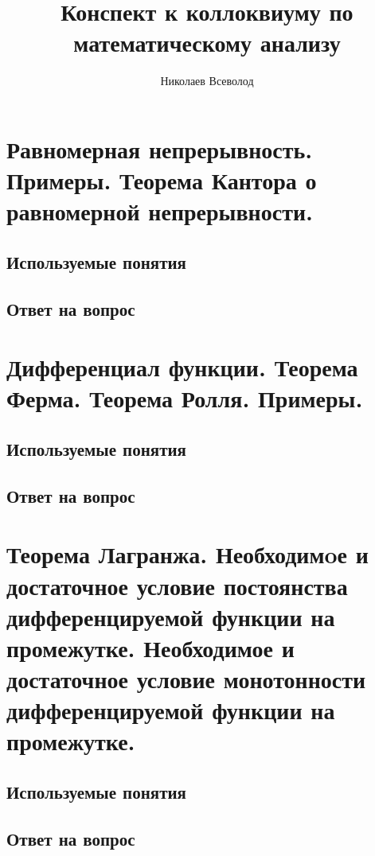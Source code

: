 \documentclass[12pt,a4paper]{article}
\title{\textbf{Конспект к коллоквиуму по математическому анализу}}
\author{Николаев Всеволод}
\begin{document}
\maketitle

\tableofcontents


\newpage
\section{Равномерная непрерывность. Примеры. Теорема Кантора о равномерной непрерывности.}

\subsection{Используемые понятия}


\subsection{Ответ на вопрос}



\newpage
\section{Дифференциал функции. Теорема Ферма. Теорема Ролля. Примеры.}

\subsection{Используемые понятия}


\subsection{Ответ на вопрос}



\newpage
\section{Теорема Лагранжа. Необходимoе и достаточное условие постоянства дифференцируемой функции на промежутке. Необходимое и достаточное условие монотонности дифференцируемой функции на промежутке.}

\subsection{Используемые понятия}


\subsection{Ответ на вопрос}

\end{document}
